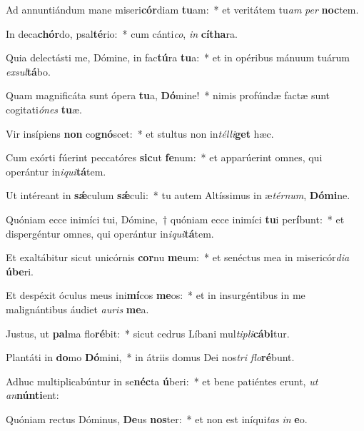 \item Ad annuntiándum mane miseri\textbf{cór}diam \textbf{tu}am:~* et veritátem tu\textit{am} \textit{per} \textbf{noc}tem.
\item In deca\textbf{chór}do, psal\textbf{té}rio:~* cum cánti\textit{co}, \textit{in} \textbf{cí}\textbf{tha}ra.
\item Quia delectásti me, Dómine, in fac\textbf{tú}ra \textbf{tu}a:~* et in opéribus mánuum tuárum \textit{ex}\textit{sul}\textbf{tá}bo.
\item Quam magnificáta sunt ópera \textbf{tu}a, \textbf{Dó}mine!~* nimis profúndæ factæ sunt cogitati\textit{ó}\textit{nes} \textbf{tu}æ.
\item Vir insípiens \textbf{non} co\textbf{gnó}scet:~* et stultus non in\textit{tél}\textit{li}\textbf{get} hæc.
\item Cum exórti fúerint peccatóres \textbf{sic}ut \textbf{fe}num:~* et apparúerint omnes, qui operántur in\textit{i}\textit{qui}\textbf{tá}tem.
\item Ut intéreant in \textbf{sǽ}culum \textbf{sǽ}culi:~* tu autem Altíssimus in æ\textit{tér}\textit{num}, \textbf{Dó}\textbf{mi}ne.
\item Quóniam ecce inimíci tui, Dómine,~† quóniam ecce inimíci \textbf{tu}i per\textbf{í}bunt:~* et dispergéntur omnes, qui operántur in\textit{i}\textit{qui}\textbf{tá}tem.
\item Et exaltábitur sicut unicórnis \textbf{cor}nu \textbf{me}um:~* et senéctus mea in misericór\textit{di}\textit{a} \textbf{ú}\textbf{be}ri.
\item Et despéxit óculus meus ini\textbf{mí}cos \textbf{me}os:~* et in insurgéntibus in me malignántibus áudiet \textit{au}\textit{ris} \textbf{me}a.
\item Justus, ut \textbf{pal}ma flo\textbf{ré}bit:~* sicut cedrus Líbani mul\textit{ti}\textit{pli}\textbf{cá}\textbf{bi}tur.
\item Plantáti in \textbf{do}mo \textbf{Dó}mini,~* in átriis domus Dei nos\textit{tri} \textit{flo}\textbf{ré}bunt.
\item Adhuc multiplicabúntur in se\textbf{néc}ta \textbf{ú}beri:~* et bene patiéntes erunt, \textit{ut} \textit{an}\textbf{nún}\textbf{ti}ent:
\item Quóniam rectus Dóminus, \textbf{De}us \textbf{nos}ter:~* et non est iníqui\textit{tas} \textit{in} \textbf{e}o.
